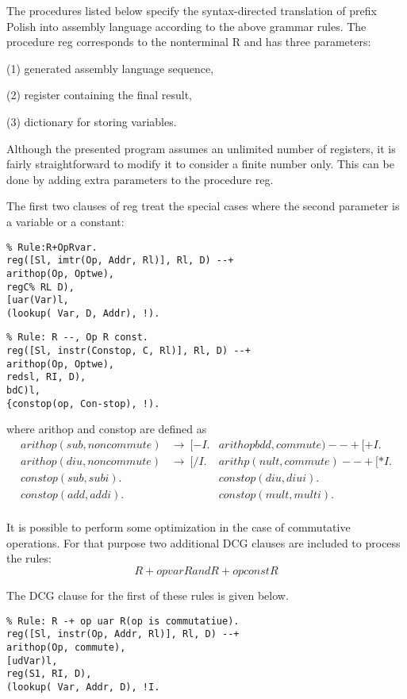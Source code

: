 The procedures listed below specify the syntax-directed translation of prefix
Polish into assembly language according to the above grammar rules. The
procedure reg corresponds to the nonterminal R and has three parameters:

(1) generated assembly language sequence,

(2) register containing the final result,

(3) dictionary for storing variables.   

Although the presented program assumes an unlimited number of registers, it is
fairly straightforward to modify it to consider a finite number only. This can be
done by adding extra parameters to the procedure reg. 

The first two clauses of reg treat the special cases where the second parameter
is a variable or a constant:
\begin{verbatim}
% Rule:R+OpRvar.
reg([Sl, imtr(Op, Addr, Rl)], Rl, D) --+
arithop(Op, Optwe),
regC% RL D),
[uar(Var)l,
(lookup( Var, D, Addr), !).
\end{verbatim}
\begin{verbatim}
% Rule: R --, Op R const.
reg([Sl, instr(Constop, C, Rl)], Rl, D) --+
arithop(Op, Optwe),
redsl, RI, D),
bdC)l,
{constop(op, Con-stop), !). 
\end{verbatim}

where arithop and constop are defined as
\begin{align*}
arithop(sub, noncommute) &\rightarrow\ [-I. &arithopbdd, commute) --+ [+I.\\
arithop(diu, noncommute) &\rightarrow\ [/I. &arithp(nult, commute) --+ [*I.\\
constop(sub, subi). &&constop(diu, diui).\\
constop(add, addi). &&constop(mult, multi). \\
\end{align*}

It is possible to perform some optimization in the case of commutative operations.
For that purpose two additional DCG clauses are included to process the rules:
\[R + op var R and R + op const R\]

The DCG clause for the first of these rules is given below.
\begin{verbatim}
% Rule: R -+ op uar R(op is commutatiue).
reg([Sl, instr(Op, Addr, Rl)], Rl, D) --+
arithop(Op, commute),
[udVar)l,
reg(S1, RI, D),
(lookup( Var, Addr, D), !I.  
\end{verbatim}

